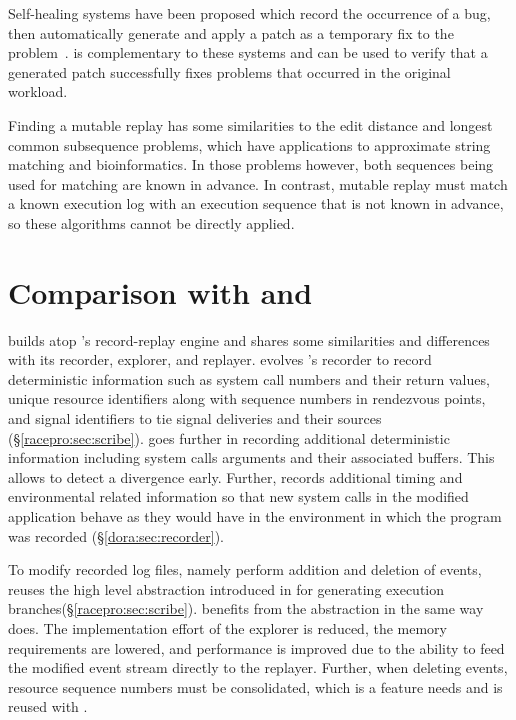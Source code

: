 Self-healing systems have been proposed which 
record the occurrence of a bug, then automatically generate and apply
a patch as a temporary fix to the problem~\cite{assure:asplos09}.
{\dora} is complementary
to these systems and can be used to
verify that a generated patch successfully fixes
problems that occurred in the original workload.

Finding a mutable replay has some similarities
to the edit distance and longest common subsequence
problems, which have applications to approximate string matching and
bioinformatics. In those problems however, both
sequences being used for matching are known in advance. In contrast,
mutable replay must match a known execution log with an
execution sequence that is not known in advance, so these algorithms cannot be
directly applied.

\section{Comparison with \scribe and \racepro}

\dora builds atop \racepro's record-replay engine and shares some similarities
and differences with its recorder, explorer, and replayer.
\racepro evolves \scribe's recorder to record deterministic information such as
system call numbers and their return values, unique resource identifiers along
with sequence numbers in rendezvous points, and signal identifiers to tie signal
deliveries and their sources (\S\ref{racepro:sec:scribe}). \dora goes further
in recording additional deterministic information including system calls
arguments and their associated buffers.  This allows \dora to detect a
divergence early. Further, \dora records additional timing and
environmental related information so that new system calls in the modified
application behave as they would have in the environment in which the program
was recorded (\S\ref{dora:sec:recorder}).

To modify recorded log files, namely perform addition and deletion of events,
\dora reuses the high level abstraction introduced in \racepro for generating
execution branches(\S\ref{racepro:sec:scribe}).
\dora benefits from the abstraction in the same way \racepro does. 
The implementation effort of the explorer is reduced, the memory
requirements are lowered, and performance is improved due to the ability to feed
the modified event stream directly to the replayer.
Further, when deleting events, resource sequence numbers must be consolidated,
which is a feature \racepro needs and is reused with \dora.


